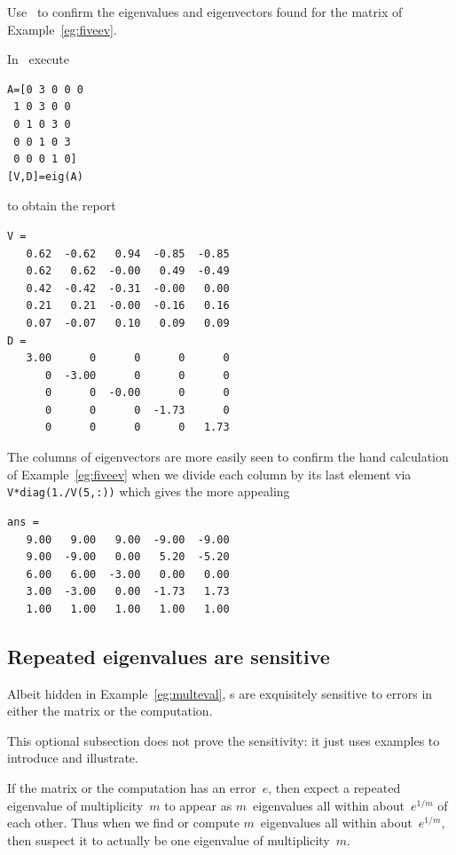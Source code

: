 \begin{example} \label{eg:}
Use \script\ to confirm the eigenvalues and eigenvectors found for the matrix of Example~\ref{eg:fiveev}.
\begin{solution} 
In \script\ execute
\begin{verbatim}
A=[0 3 0 0 0
 1 0 3 0 0
 0 1 0 3 0
 0 0 1 0 3
 0 0 0 1 0]
[V,D]=eig(A)
\end{verbatim}
\setbox\ajrqrbox\hbox{}%
\marginpar{\usebox{\ajrqrbox}}%
to obtain the report \twodp
\begin{verbatim}
V =
   0.62  -0.62   0.94  -0.85  -0.85
   0.62   0.62  -0.00   0.49  -0.49
   0.42  -0.42  -0.31  -0.00   0.00
   0.21   0.21  -0.00  -0.16   0.16
   0.07  -0.07   0.10   0.09   0.09
D =
   3.00      0      0      0      0
      0  -3.00      0      0      0
      0      0  -0.00      0      0
      0      0      0  -1.73      0
      0      0      0      0   1.73
\end{verbatim}
The columns of eigenvectors are more easily seen to confirm the hand calculation of Example~\ref{eg:fiveev} when we divide each column by its last element via \verb|V*diag(1./V(5,:))| which gives the more appealing \twodp
\begin{verbatim}
ans =
   9.00   9.00   9.00  -9.00  -9.00
   9.00  -9.00   0.00   5.20  -5.20
   6.00   6.00  -3.00   0.00   0.00
   3.00  -3.00   0.00  -1.73   1.73
   1.00   1.00   1.00   1.00   1.00
\end{verbatim}
\end{solution}
\end{example}







\subsection{Repeated eigenvalues are sensitive}
\label{sec:reas}



Albeit hidden in Example~\ref{eg:multeval}, s are exquisitely sensitive to errors in either the matrix or the computation.
\begin{aside}
This optional subsection does not prove the sensitivity: it just uses examples to introduce and illustrate.
\end{aside}
If the matrix or the computation has an error~\(e\), then expect a repeated eigenvalue of multiplicity~\(m\) to appear as \(m\)~eigenvalues all within about~\(e^{1/m}\) of each other.
Thus when we find or compute \(m\)~eigenvalues all within about~\(e^{1/m}\), then suspect it to actually be one eigenvalue of multiplicity~\(m\).

